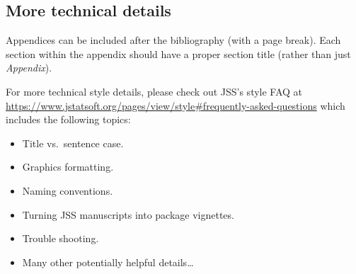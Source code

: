 \documentclass[article]{jss}
\begin{document}
\newpage

\begin{appendix}

\section{More technical details} \label{app:technical}

\begin{leftbar}
Appendices can be included after the bibliography (with a page break). Each
section within the appendix should have a proper section title (rather than
just \emph{Appendix}).

For more technical style details, please check out JSS's style FAQ at
\url{https://www.jstatsoft.org/pages/view/style#frequently-asked-questions}
which includes the following topics:
\begin{itemize}
  \item Title vs.\ sentence case.
  \item Graphics formatting.
  \item Naming conventions.
  \item Turning JSS manuscripts into  package vignettes.
  \item Trouble shooting.
  \item Many other potentially helpful details\dots
\end{itemize}
\end{leftbar}


\end{appendix}




\end{document}
